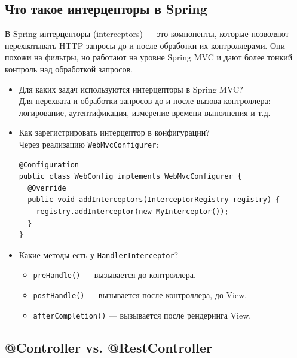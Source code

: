 \documentclass[a4paper,14pt]{article}
\begin{document}
\subsection{Что такое интерцепторы в Spring}
В Spring интерцепторы (interceptors) — это компоненты, которые позволяют перехватывать HTTP-запросы до и после обработки их контроллерами. Они похожи на фильтры, но работают на уровне Spring MVC и дают более тонкий контроль над обработкой запросов.
\begin{itemize}
\item Для каких задач используются интерцепторы в Spring MVC? \\
Для перехвата и обработки запросов до и после вызова контроллера: логирование, аутентификация, измерение времени выполнения и т.д.

\item Как зарегистрировать интерцептор в конфигурации? \\
Через реализацию \texttt{WebMvcConfigurer}:
\begin{lstlisting}[style=javastyle]
@Configuration
public class WebConfig implements WebMvcConfigurer {
  @Override
  public void addInterceptors(InterceptorRegistry registry) {
    registry.addInterceptor(new MyInterceptor());
  }
}
\end{lstlisting}

\item Какие методы есть у \texttt{HandlerInterceptor}? \\
\begin{itemize}
  \item \texttt{preHandle()} — вызывается до контроллера.
  \item \texttt{postHandle()} — вызывается после контроллера, до View.
  \item \texttt{afterCompletion()} — вызывается после рендеринга View.
\end{itemize}
\end{itemize}
\subsection{@Controller vs. @RestController}
\end{document}

